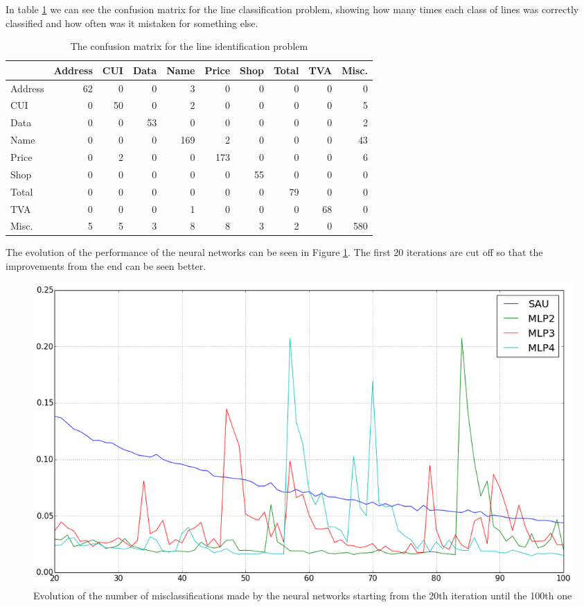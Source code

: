 In table \ref{table:line_identify} we can see the confusion matrix for the line classification problem, showing how many times each class of lines was correctly classified and how often was it mistaken for something else. 

\begin{table}[h]
\caption{The confusion matrix for the line identification problem}
\label{table:line_identify}
\begin{tabular}{lrrrrrrrrr}
\toprule
{} &  Address &  CUI &  Data &  Name &  Price &  Shop &  Total &  TVA &  Misc. \\
\midrule
Address &       62 &    0 &     0 &     3 &      0 &     0 &      0 &    0 &        0 \\
CUI     &        0 &   50 &     0 &     2 &      0 &     0 &      0 &    0 &        5 \\
Data    &        0 &    0 &    53 &     0 &      0 &     0 &      0 &    0 &        2 \\
Name    &        0 &    0 &     0 &   169 &      2 &     0 &      0 &    0 &       43 \\
Price   &        0 &    2 &     0 &     0 &    173 &     0 &      0 &    0 &        6 \\
Shop    &        0 &    0 &     0 &     0 &      0 &    55 &      0 &    0 &        0 \\
Total   &        0 &    0 &     0 &     0 &      0 &     0 &     79 &    0 &        0 \\
TVA     &        0 &    0 &     0 &     1 &      0 &     0 &      0 &   68 &        0 \\
Misc.   &        5 &    5 &     3 &     8 &      8 &     3 &      2 &    0 &      580 \\
\bottomrule
\end{tabular}
\end{table}

The evolution of the performance of the neural networks can be seen in Figure \ref{fig:nn_iteration}. The first 20 iterations are cut off so that the improvements from the end can be seen better. 

\begin{figure}[h!]
\begin{center}
\includegraphics[width=\linewidth]{img/nn_iteration.png}
\caption{\label{fig:nn_iteration}
Evolution of the number of misclassifications made by the neural networks  starting from the 20th iteration until the 100th one}
\end{center}
\end{figure}

